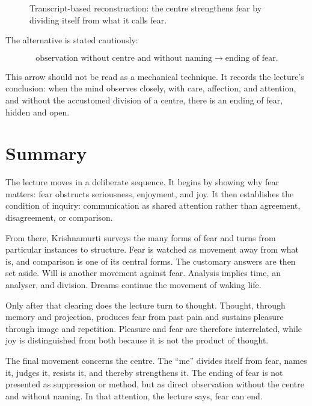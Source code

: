 \begin{figure}
\centering
{}
\caption{Transcript-based reconstruction: the centre strengthens fear by dividing itself from what it calls fear.}
\end{figure}

The alternative is stated cautiously:

\begin{equation}
\text{observation without centre and without naming}
\longrightarrow
\text{ending of fear}.
\end{equation}

This arrow should not be read as a mechanical technique. It records the lecture's conclusion: when the mind observes closely, with care, affection, and attention, and without the accustomed division of a centre, there is an ending of fear, hidden and open.

\section{Summary}

The lecture moves in a deliberate sequence. It begins by showing why fear matters: fear obstructs seriousness, enjoyment, and joy. It then establishes the condition of inquiry: communication as shared attention rather than agreement, disagreement, or comparison.

From there, Krishnamurti surveys the many forms of fear and turns from particular instances to structure. Fear is watched as movement away from what is, and comparison is one of its central forms. The customary answers are then set aside. Will is another movement against fear. Analysis implies time, an analyser, and division. Dreams continue the movement of waking life.

Only after that clearing does the lecture turn to thought. Thought, through memory and projection, produces fear from past pain and sustains pleasure through image and repetition. Pleasure and fear are therefore interrelated, while joy is distinguished from both because it is not the product of thought.

The final movement concerns the centre. The ``me'' divides itself from fear, names it, judges it, resists it, and thereby strengthens it. The ending of fear is not presented as suppression or method, but as direct observation without the centre and without naming. In that attention, the lecture says, fear can end.